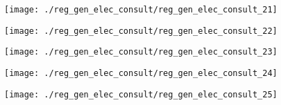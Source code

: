 \begin{figure}[!ht]
    \centering
    \texttt{[image: ./reg\_gen\_elec\_consult/reg\_gen\_elec\_consult\_21]}
\end{figure}
\clearpage

\begin{figure}[!ht]
    \centering
    \texttt{[image: ./reg\_gen\_elec\_consult/reg\_gen\_elec\_consult\_22]}
\end{figure}
\clearpage

\begin{figure}[!ht]
    \centering
    \texttt{[image: ./reg\_gen\_elec\_consult/reg\_gen\_elec\_consult\_23]}
\end{figure}
\clearpage

\begin{figure}[!ht]
    \centering
    \texttt{[image: ./reg\_gen\_elec\_consult/reg\_gen\_elec\_consult\_24]}
\end{figure}
\clearpage

\begin{figure}[!ht]
    \centering
    \texttt{[image: ./reg\_gen\_elec\_consult/reg\_gen\_elec\_consult\_25]}
\end{figure}
\clearpage

